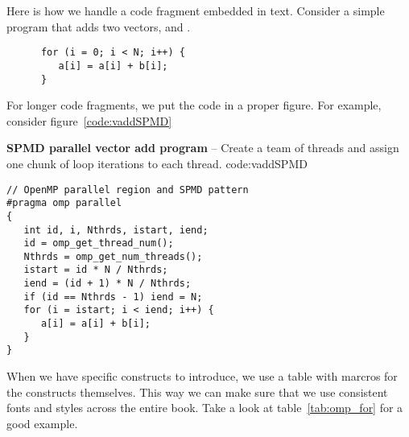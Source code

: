 Here is how we handle a code fragment embedded in text.
Consider a simple program that adds two vectors,  and .
\begin{verbatim}
      for (i = 0; i < N; i++) { 
         a[i] = a[i] + b[i];
      }
\end{verbatim}  

For longer code fragments, we put the code in a proper figure.  For example, consider figure~\ref{code:vaddSPMD}

\begin{CodeExample}%
{\textbf{SPMD parallel vector add program} -- \small
Create a team of threads and assign one chunk of loop iterations
to each thread.
}%
{code:vaddSPMD}
\begin{lstlisting}
// OpenMP parallel region and SPMD pattern
#pragma omp parallel
{
   int id, i, Nthrds, istart, iend;
   id = omp_get_thread_num();
   Nthrds = omp_get_num_threads(); 
   istart = id * N / Nthrds;
   iend = (id + 1) * N / Nthrds;
   if (id == Nthrds - 1) iend = N; 
   for (i = istart; i < iend; i++) {
      a[i] = a[i] + b[i];
   }
}
\end{lstlisting}
\end{CodeExample} 



When we have specific constructs to introduce, we use a table with marcros for the constructs themselves.  This way we can make 
sure that we use consistent fonts and styles across the entire book.  Take a look at table~\ref{tab:omp_for} for a good example.


